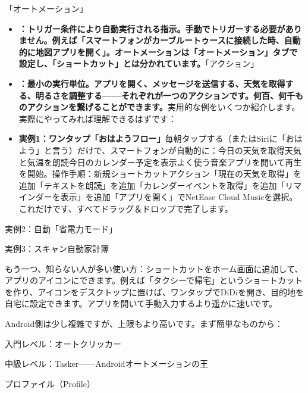 「オートメーション」

\begin{itemize}
  \item \textbf{：トリガー条件により自動実行される指示。手動でトリガーする必要がありません。例えば「スマートフォンがカーブルートゥースに接続した時、自動的に地図アプリを開く」。オートメーションは「オートメーション」タブで設定し、「ショートカット」とは分かれています。}「アクション」
  \item \textbf{：最小の実行単位。アプリを開く、メッセージを送信する、天気を取得する、明るさを調整する——それぞれが一つのアクションです。何百、何千ものアクションを繋げることができます。}実用的な例をいくつか紹介します。実際にやってみれば理解できるはずです：
  \item \textbf{実例1：ワンタップ「おはようフロー」}毎朝タップする（またはSiriに「おはよう」と言う）だけで、スマートフォンが自動的に：今日の天気を取得天気と気温を朗読今日のカレンダー予定を表示よく使う音楽アプリを開いて再生を開始。操作手順：新規ショートカットアクション「現在の天気を取得」を追加「テキストを朗読」を追加「カレンダーイベントを取得」を追加「リマインダーを表示」を追加「アプリを開く」でNetEase Cloud Musicを選択。これだけです、すべてドラッグ＆ドロップで完了します。
\end{itemize}

実例2：自動「省電力モード」


実例3：スキャン自動家計簿


もう一つ、知らない人が多い使い方：ショートカットをホーム画面に追加して、アプリのアイコンにできます。例えば「タクシーで帰宅」というショートカットを作り、アイコンをデスクトップに置けば、ワンタップでDiDiを開き、目的地を自宅に設定できます。アプリを開いて手動入力するより遥かに速いです。


Android側は少し複雑ですが、上限もより高いです。まず簡単なものから：

入門レベル：オートクリッカー


中級レベル：Tasker——Androidオートメーションの王


プロファイル（Profile）


